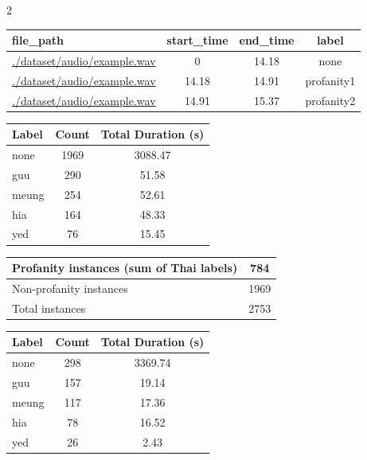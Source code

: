 \documentclass[11pt,a4paper]{article}
\newenvironment{Table}
   {\par\bigskip\noindent\minipage{\columnwidth}\centering}
   {\endminipage\par\bigskip}
\begin{document}
\begin{multicols}{2}
\begin{Table}
\small
\begin{tabularx}{\columnwidth}{|>{\raggedright\arraybackslash}X|c|c|c|} \hline
file\_path & start\_time & end\_time & label \\ \hline
\url{./dataset/audio/example.wav} & 0 & 14.18 & none \\ \hline
\url{./dataset/audio/example.wav} & 14.18 & 14.91 & profanity1 \\ \hline
\url{./dataset/audio/example.wav} & 14.91 & 15.37 & profanity2 \\ \hline
\end{tabularx}
\end{Table}



\begin{Table}
\small
\begin{tabularx}{\columnwidth}{|>{\raggedright\arraybackslash}X|c|c|}
\hline
Label & Count & Total Duration (s) \\ \hline
none & 1969 & 3088.47 \\ \hline
guu & 290 & 51.58 \\ \hline
meung & 254 & 52.61 \\ \hline
hia & 164 & 48.33 \\ \hline
yed & 76 & 15.45 \\ \hline
\end{tabularx}
\end{Table}

\begin{Table}
\small
\begin{tabularx}{\columnwidth}{|>{\raggedright\arraybackslash}X|c|}
\hline
Profanity instances (sum of Thai labels) & 784 \\ \hline
Non-profanity instances & 1969 \\ \hline
Total instances & 2753 \\ \hline
\end{tabularx}
\end{Table}

\begin{Table}
\small
\begin{tabularx}{\columnwidth}{|>{\raggedright\arraybackslash}X|c|c|}
\hline
Label & Count & Total Duration (s) \\ \hline
none & 298 & 3369.74 \\ \hline
guu & 157 & 19.14 \\ \hline
meung & 117 & 17.36 \\ \hline
hia & 78 & 16.52 \\ \hline
yed & 26 & 2.43 \\ \hline
\end{tabularx}
\end{Table}


\end{multicols}
\end{document}
